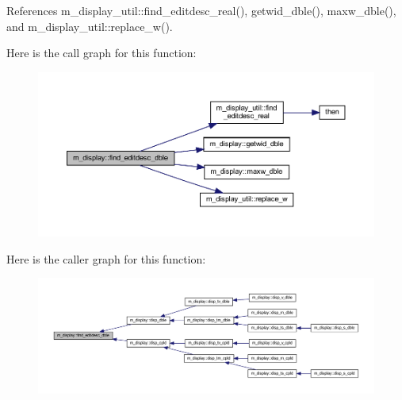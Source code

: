 References m\+\_\+display\+\_\+util\+::find\+\_\+editdesc\+\_\+real(), getwid\+\_\+dble(), maxw\+\_\+dble(), and m\+\_\+display\+\_\+util\+::replace\+\_\+w().

Here is the call graph for this function\+:
\nopagebreak
\begin{figure}[H]
\begin{center}
\leavevmode
\includegraphics[width=350pt]{namespacem__display_a60a64829b11da65ab599a10719eea3cd_cgraph}
\end{center}
\end{figure}
Here is the caller graph for this function\+:
\nopagebreak
\begin{figure}[H]
\begin{center}
\leavevmode
\includegraphics[width=350pt]{namespacem__display_a60a64829b11da65ab599a10719eea3cd_icgraph}
\end{center}
\end{figure}
\mbox{\label{namespacem__display_ab6e1e0eb1c077b4d2a0c6698c78925a3}} 

